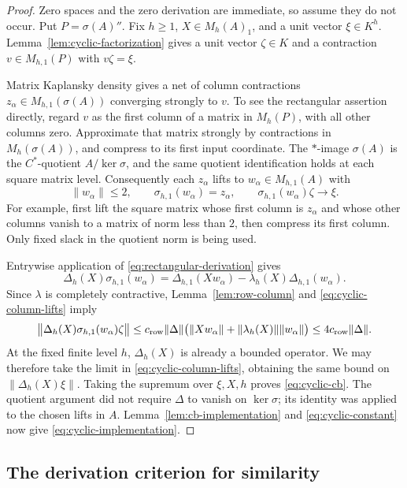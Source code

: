 \begin{proof}
Zero spaces and the zero derivation are immediate, so assume they do
not occur. Put \(P=\sigma(A)''\). Fix \(h\ge1\),
\(X\in M_h(A)_1\), and a unit vector \(\xi\in K^h\).
Lemma~\ref{lem:cyclic-factorization} gives a unit vector \(\zeta\in K\)
and a contraction \(v\in M_{h,1}(P)\) with \(v\zeta=\xi\).

Matrix Kaplansky density gives a net of column contractions
\(z_\alpha\in M_{h,1}(\sigma(A))\) converging strongly to \(v\).
To see the rectangular assertion directly, regard \(v\) as the first
column of a matrix in \(M_h(P)\), with all other columns zero.
Approximate that matrix strongly by contractions in
\(M_h(\sigma(A))\), and compress to its first input coordinate.
The \(*\)-image \(\sigma(A)\) is the \(C^*\)-quotient
\(A/\ker\sigma\), and the same quotient identification holds at each
square matrix level. Consequently each \(z_\alpha\) lifts to
\(w_\alpha\in M_{h,1}(A)\) with
\begin{equation}
 \|w_\alpha\|\le2,\qquad
 \sigma_{h,1}(w_\alpha)=z_\alpha,\qquad
 \sigma_{h,1}(w_\alpha)\zeta\longrightarrow\xi.
 \label{eq:cyclic-column-lifts}
\end{equation}
For example, first lift the square matrix whose first column is
\(z_\alpha\) and whose other columns vanish to a matrix of norm less
than \(2\), then compress its first column. Only fixed slack in the
quotient norm is being used.

Entrywise application of \eqref{eq:rectangular-derivation} gives
\[
 \Delta_h(X)\sigma_{h,1}(w_\alpha)
   =\Delta_{h,1}(Xw_\alpha)
       -\lambda_h(X)\Delta_{h,1}(w_\alpha).
\]
Since \(\lambda\) is completely contractive, Lemma~\ref{lem:row-column}
and \eqref{eq:cyclic-column-lifts} imply
\[
 \bigl\|\Delta_h(X)\sigma_{h,1}(w_\alpha)\zeta\bigr\|
 \le c_{\rm row}\|\Delta\|
       \bigl(\|Xw_\alpha\|+\|\lambda_h(X)\|\|w_\alpha\|\bigr)
 \le4c_{\rm row}\|\Delta\|.
\]
At the fixed finite level \(h\), \(\Delta_h(X)\) is already a bounded
operator. We may therefore take the limit in
\eqref{eq:cyclic-column-lifts}, obtaining the same bound on
\(\|\Delta_h(X)\xi\|\). Taking the supremum over \(\xi,X,h\)
proves \eqref{eq:cyclic-cb}. The quotient argument did not require
\(\Delta\) to vanish on \(\ker\sigma\); its identity was applied to
the chosen lifts in \(A\). Lemma~\ref{lem:cb-implementation} and
\eqref{eq:cyclic-constant} now give
\eqref{eq:cyclic-implementation}.
\end{proof}

\subsection{The derivation criterion for similarity}

